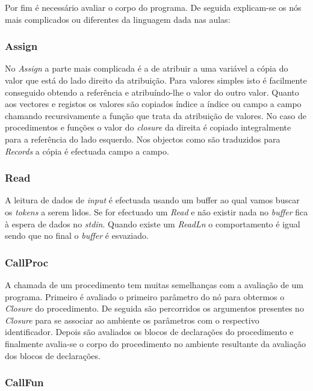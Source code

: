 Por fim é necessário avaliar o corpo do programa. De seguida explicam-se os 
nós mais complicados ou diferentes da linguagem dada nas aulas:

\subsubsection{Assign}

No \emph{Assign} a parte mais complicada é a de atribuir a uma variável a 
cópia do valor que está do lado direito da atribuição. Para valores simples 
isto é facilmente conseguido obtendo a referência e atribuíndo-lhe o valor do 
outro valor. Quanto aos vectores e registos os valores são copiados índice a 
índice ou campo a campo chamando recursivamente a função que trata da 
atribuição de valores. No caso de procedimentos e funções o valor do 
\emph{closure} da direita é copiado integralmente para a referência do lado 
esquerdo. Nos objectos como são traduzidos para \emph{Records} a cópia é 
efectuada campo a campo.

\subsubsection{Read}

A leitura de dados de \emph{input} é efectuada usando um buffer ao qual vamos 
buscar os \emph{tokens} a serem lidos. Se for efectuado um \emph{Read} e não 
existir nada no \emph{buffer} fica à espera de dados no \emph{stdin}. Quando 
existe um \emph{ReadLn} o comportamento é igual sendo que no final o 
\emph{buffer} é esvaziado.

\subsubsection{CallProc}

A chamada de um procedimento tem muitas semelhanças com a avaliação de um 
programa. Primeiro é avaliado o primeiro parâmetro do nó para obtermos o 
\emph{Closure} do procedimento. De seguida são percorridos os argumentos 
presentes no \emph{Closure} para se associar ao ambiente os parâmetros com o 
respectivo identificador. Depois são avaliados os blocos de declarações do 
procedimento e finalmente avalia-se o corpo do procedimento no ambiente 
resultante da avaliação dos blocos de declarações.

\subsubsection{CallFun}

